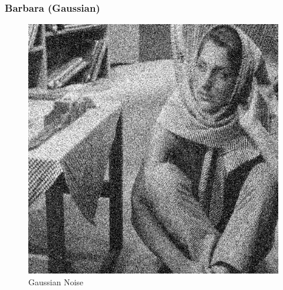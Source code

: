 \documentclass{article}
\begin{document}
    \subsubsection*{Barbara (Gaussian)}
    
    \begin{figure}[!htb]
    \begin{center}
     \includegraphics[scale=.3]{./basic_denoising/barbara/gaussian.png}
     \caption{Gaussian Noise}
    \end{center}
    \end{figure}
    
\end{document}
